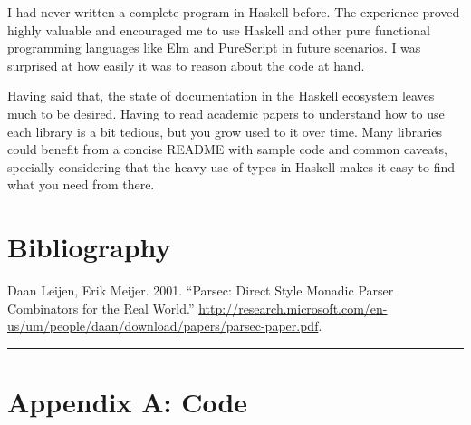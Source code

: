 \documentclass[]{article}
\begin{document}
I had never written a complete program in Haskell before. The experience
proved highly valuable and encouraged me to use Haskell and other pure
functional programming languages like Elm and PureScript in future
scenarios. I was surprised at how easily it was to reason about the code
at hand.

Having said that, the state of documentation in the Haskell ecosystem
leaves much to be desired. Having to read academic papers to understand
how to use each library is a bit tedious, but you grow used to it over
time. Many libraries could benefit from a concise README with sample
code and common caveats, specially considering that the heavy use of
types in Haskell makes it easy to find what you need from there.

\section{Bibliography}\label{bibliography}

Daan Leijen, Erik Meijer. 2001. “Parsec: Direct Style Monadic Parser Combinators
for the Real World.” \url{http://research.microsoft.com/en-us/um/people/daan/download/papers/parsec-paper.pdf}.

\begin{center}\rule{0.5\linewidth}{\linethickness}\end{center}

\clearpage

\section{Appendix A: Code}\label{appendix-a-code}











\end{document}
